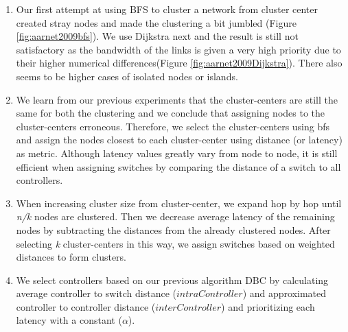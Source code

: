 \documentclass{article}
\begin{document}
\begin{enumerate}
		\item Our first attempt at using BFS to cluster a network from cluster center created stray nodes and made the clustering a bit jumbled (Figure \ref{fig:aarnet2009bfs}). We use Dijkstra next and the result is still not satisfactory as the bandwidth of the links is given a very high priority due to their higher numerical differences(Figure \ref{fig:aarnet2009Dijkstra}). There also seems to be higher cases of isolated nodes or islands.
		
		\item We learn from our previous experiments that the cluster-centers are still the same for both the clustering and we conclude that assigning nodes to the cluster-centers erroneous. Therefore, we select the cluster-centers using bfs and assign the nodes closest to each cluster-center using distance (or latency) as metric. Although latency values greatly vary from node to node, it is still efficient when assigning switches by comparing the distance of a switch to all controllers.
		
		\item When increasing cluster size from cluster-center, we expand hop by hop until \textit{n/k} nodes are clustered. Then we decrease average latency of the remaining nodes by subtracting the distances from the already clustered nodes. After selecting \textit{k} cluster-centers in this way, we assign switches based on weighted distances to form clusters.
		
		\item We select controllers based on our previous algorithm DBC by calculating average controller to switch distance ($intraController$) and approximated controller to controller distance ($interController$) and prioritizing each latency with a constant ($\alpha$).
	\end{enumerate}
 
\end{document}
